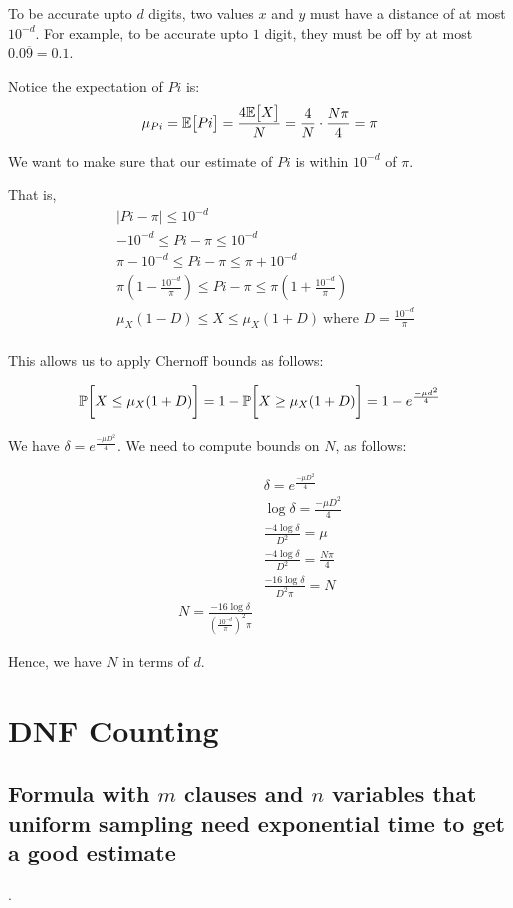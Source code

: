 \documentclass{article}
\begin{document}
To be accurate upto $d$ digits, two values $x$ and $y$ must have a distance
of at most $10^{-d}$. For example, to be accurate upto $1$ digit, they
must be off by at most $0.0\overline{9} = 0.1$.

Notice the expectation of $Pi$ is:
\begin{align*}
\mu_{Pi} =  \mathbb{E}\big[ Pi \big] = \frac{4\mathbb{E}\big[ X \big]}{N} = \frac{4}{N} \cdot \frac{N \pi}{4} = \pi
\end{align*}

We want to make sure that our estimate of $Pi$ is within $10^{-d}$ of $\pi$.

That is,
\begin{align*}
&|Pi - \pi| \leq 10^{-d} \\
&-10^{-d} \leq Pi - \pi \leq 10^{-d} \\
&\pi -10^{-d} \leq Pi - \pi \leq \pi + 10^{-d} \\
&\pi(1 - \frac{10^{-d}}{\pi}) \leq Pi - \pi \leq \pi(1 + \frac{10^{-d}}{\pi}) \\
& \mu_X (1 - D) \leq X \leq  \mu_X (1 + D)~\text{where $D = \frac{10^{-d}}{\pi}$} \\
\end{align*}

This allows us to apply Chernoff bounds as follows:

\begin{align*}
\mathbb{P}\bigg[  X \leq  \mu_X (1 + D) \bigg] = 1 -  \mathbb{P}\bigg[ X \geq  \mu_X (1 + D) \bigg] = 1 - e^{\frac{-\mu d^2}{4}}
\end{align*}

We have $\delta = e^{\frac{-\mu D^2}{4}}$. We need to compute bounds on $N$, as follows:

\begin{align*}
&\delta = e^{\frac{-\mu D^2}{4}} \\
&\log \delta = \frac{-\mu D^2}{4} \\
&\frac{- 4 \log \delta}{D^2} = \mu \\
&\frac{- 4 \log \delta}{D^2} = \frac{N\pi}{4} \\
&\frac{- 16 \log \delta}{D^2 \pi} = N \\
N = \frac{- 16 \log \delta}{(\frac{10^{-d}}{\pi})^2 \pi}
\end{align*}

Hence, we have $N$ in terms of $d$.

\section{DNF Counting}
\subsection{Formula with $m$ clauses and $n$ variables that uniform sampling
need exponential time to get a good estimate}.
\end{document}
